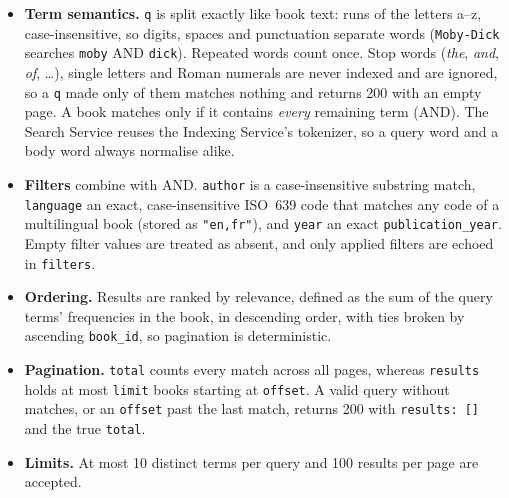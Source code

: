 \documentclass[10pt,a4paper]{article}
\newcommand{\code}[1]{\texttt{#1}}
\begin{document}
\begin{itemize}
  \item \textbf{Term semantics.} \code{q} is split exactly like book text:
  runs of the letters a--z, case-insensitive, so digits, spaces and punctuation
  separate words (\code{Moby-Dick} searches \code{moby} AND \code{dick}).
  Repeated words count once. Stop words (\emph{the}, \emph{and}, \emph{of},
  \ldots), single letters and Roman numerals are never indexed and are
  ignored, so a \code{q} made only of them matches nothing and returns 200 with
  an empty page. A book matches only if it contains \emph{every} remaining
  term (AND). The Search Service reuses the Indexing Service's tokenizer, so a
  query word and a body word always normalise alike.
  \item \textbf{Filters} combine with AND. \code{author} is a case-insensitive
  substring match, \code{language} an exact, case-insensitive ISO~639 code that
  matches any code of a multilingual book (stored as \code{"en,fr"}), and
  \code{year} an exact \code{publication\_year}. Empty filter values are treated
  as absent, and only applied filters are echoed in \code{filters}.
  \item \textbf{Ordering.} Results are ranked by relevance, defined as the sum
  of the query terms' frequencies in the book, in descending order, with ties
  broken by ascending \code{book\_id}, so pagination is deterministic.
  \item \textbf{Pagination.} \code{total} counts every match across all pages,
  whereas \code{results} holds at most \code{limit} books starting at
  \code{offset}. A valid query without matches, or an \code{offset} past the
  last match, returns 200 with \code{results: []} and the true \code{total}.
  \item \textbf{Limits.} At most 10 distinct terms per query and 100 results
  per page are accepted.
\end{itemize}
\end{document}
